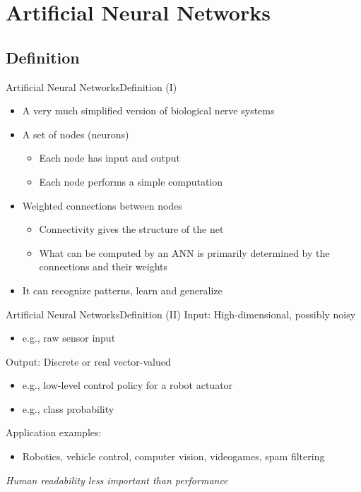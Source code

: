 \documentclass[10pt,compress]{beamer} %
\begin{document}
\section{Artificial Neural Networks}
\subsection{Definition}

\begin{frame}{Artificial Neural Networks}{Definition (I)}
	\begin{itemize}
	\item A very much simplified version of biological nerve systems
	\item A set of nodes (neurons) 
		\begin{itemize}
		\item Each node has input and output
		\item Each node performs a simple computation 
		\end{itemize}
	\item Weighted connections between nodes
		\begin{itemize}
		\item Connectivity gives the structure of the net
		\item What can be computed by an ANN is primarily determined by the connections and their weights
		\end{itemize}
	\item It can \alert{recognize patterns}, \alert{learn} and \alert{generalize}
	\end{itemize}
\end{frame}

\begin{frame}{Artificial Neural Networks}{Definition (II)}
Input: High-dimensional, possibly noisy
	\begin{itemize}
	\item e.g., raw sensor input
	\end{itemize}
Output: Discrete or real vector-valued
	\begin{itemize}
	\item e.g., low-level control policy for a robot actuator
	\item e.g., class probability
	\end{itemize}
Application examples: 
	\begin{itemize}
		\item Robotics, vehicle control, computer vision, videogames, spam filtering
	\end{itemize}
\textit{Human readability less important than performance}
\end{frame}
\end{document}
